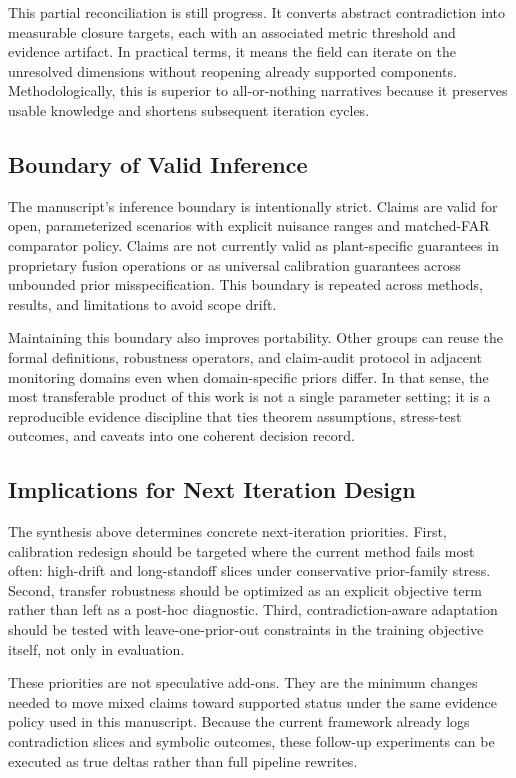 This partial reconciliation is still progress. It converts abstract contradiction into measurable closure targets, each with an associated metric threshold and evidence artifact. In practical terms, it means the field can iterate on the unresolved dimensions without reopening already supported components. Methodologically, this is superior to all-or-nothing narratives because it preserves usable knowledge and shortens subsequent iteration cycles.

\subsection{Boundary of Valid Inference}
The manuscript's inference boundary is intentionally strict. Claims are valid for open, parameterized scenarios with explicit nuisance ranges and matched-FAR comparator policy. Claims are not currently valid as plant-specific guarantees in proprietary fusion operations or as universal calibration guarantees across unbounded prior misspecification. This boundary is repeated across methods, results, and limitations to avoid scope drift.

Maintaining this boundary also improves portability. Other groups can reuse the formal definitions, robustness operators, and claim-audit protocol in adjacent monitoring domains even when domain-specific priors differ. In that sense, the most transferable product of this work is not a single parameter setting; it is a reproducible evidence discipline that ties theorem assumptions, stress-test outcomes, and caveats into one coherent decision record.

\subsection{Implications for Next Iteration Design}
The synthesis above determines concrete next-iteration priorities. First, calibration redesign should be targeted where the current method fails most often: high-drift and long-standoff slices under conservative prior-family stress. Second, transfer robustness should be optimized as an explicit objective term rather than left as a post-hoc diagnostic. Third, contradiction-aware adaptation should be tested with leave-one-prior-out constraints in the training objective itself, not only in evaluation.

These priorities are not speculative add-ons. They are the minimum changes needed to move mixed claims toward supported status under the same evidence policy used in this manuscript. Because the current framework already logs contradiction slices and symbolic outcomes, these follow-up experiments can be executed as true deltas rather than full pipeline rewrites.

